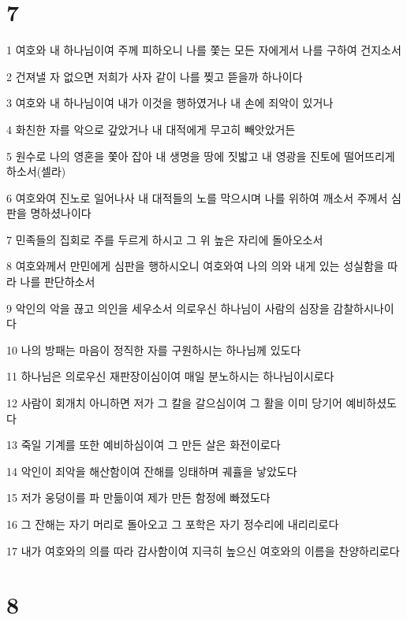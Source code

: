 \chapter{7}

\par 1 여호와 내 하나님이여 주께 피하오니 나를 쫓는 모든 자에게서 나를 구하여 건지소서
\par 2 건져낼 자 없으면 저희가 사자 같이 나를 찢고 뜯을까 하나이다
\par 3 여호와 내 하나님이여 내가 이것을 행하였거나 내 손에 죄악이 있거나
\par 4 화친한 자를 악으로 갚았거나 내 대적에게 무고히 빼앗았거든
\par 5 원수로 나의 영혼을 쫓아 잡아 내 생명을 땅에 짓밟고 내 영광을 진토에 떨어뜨리게 하소서(셀라)
\par 6 여호와여 진노로 일어나사 내 대적들의 노를 막으시며 나를 위하여 깨소서 주께서 심판을 명하셨나이다
\par 7 민족들의 집회로 주를 두르게 하시고 그 위 높은 자리에 돌아오소서
\par 8 여호와께서 만민에게 심판을 행하시오니 여호와여 나의 의와 내게 있는 성실함을 따라 나를 판단하소서
\par 9 악인의 악을 끊고 의인을 세우소서 의로우신 하나님이 사람의 심장을 감찰하시나이다
\par 10 나의 방패는 마음이 정직한 자를 구원하시는 하나님께 있도다
\par 11 하나님은 의로우신 재판장이심이여 매일 분노하시는 하나님이시로다
\par 12 사람이 회개치 아니하면 저가 그 칼을 갈으심이여 그 활을 이미 당기어 예비하셨도다
\par 13 죽일 기계를 또한 예비하심이여 그 만든 살은 화전이로다
\par 14 악인이 죄악을 해산함이여 잔해를 잉태하며 궤휼을 낳았도다
\par 15 저가 웅덩이를 파 만듦이여 제가 만든 함정에 빠졌도다
\par 16 그 잔해는 자기 머리로 돌아오고 그 포학은 자기 정수리에 내리리로다
\par 17 내가 여호와의 의를 따라 감사함이여 지극히 높으신 여호와의 이름을 찬양하리로다

\chapter{8}

